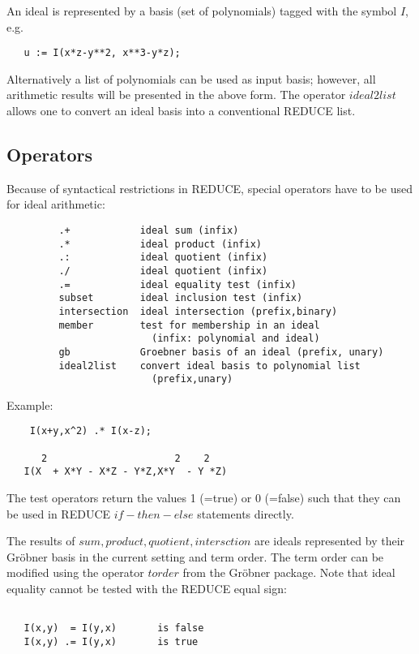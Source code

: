 An ideal is represented by a basis (set of polynomials) tagged
with the symbol $I$, e.g.
\begin{verbatim}
   u := I(x*z-y**2, x**3-y*z);
\end{verbatim}
Alternatively a list of polynomials can be used as input basis; however,
all arithmetic results will be presented in the above form. The
operator $ideal2list$ allows one to convert an ideal basis into a
conventional REDUCE list.

\subsection{Operators}

Because of syntactical restrictions in REDUCE, special operators
have to be used for ideal arithmetic:

\begin{verbatim}
         .+            ideal sum (infix)
         .*            ideal product (infix)
         .:            ideal quotient (infix)
         ./            ideal quotient (infix)
         .=            ideal equality test (infix)
         subset        ideal inclusion test (infix)
         intersection  ideal intersection (prefix,binary)
         member        test for membership in an ideal
                         (infix: polynomial and ideal)
         gb            Groebner basis of an ideal (prefix, unary)
         ideal2list    convert ideal basis to polynomial list
                         (prefix,unary)
\end{verbatim}

Example:

\begin{verbatim}
    I(x+y,x^2) .* I(x-z);

      2                      2    2
   I(X  + X*Y - X*Z - Y*Z,X*Y  - Y *Z)
\end{verbatim}

The test operators return the values 1 (=true) or 0 (=false)
such that they can be used in REDUCE $if-then-else$ statements
directly.

The results of $sum,product, quotient,intersction$ are ideals
represented by their Gr\"obner basis in the current setting and
term order. The term order can be modified using the operator
$torder$ from the Gr\"obner package. Note that ideal equality
cannot be tested with the REDUCE equal sign:

\begin{verbatim}

   I(x,y)  = I(y,x)       is false
   I(x,y) .= I(y,x)       is true

\end{verbatim}

